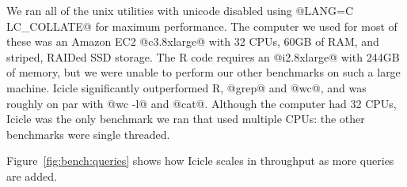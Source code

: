 We ran all of the unix utilities with unicode disabled using @LANG=C LC_COLLATE@ for maximum performance.
The computer we used for most of these was an Amazon EC2 @c3.8xlarge@ with 32 CPUs, 60GB of RAM, and striped, RAIDed SSD storage.
The R code requires an @i2.8xlarge@ with 244GB of memory, but we were unable to perform our other benchmarks on such a large machine.
Icicle significantly outperformed R, @grep@ and @wc@, and was roughly on par with @wc -l@ and @cat@.
Although the computer had 32 CPUs, Icicle was the only benchmark we ran that used multiple CPUs: the other benchmarks were single threaded.

Figure~\ref{fig:bench:queries} shows how Icicle scales in throughput as more queries are added.

